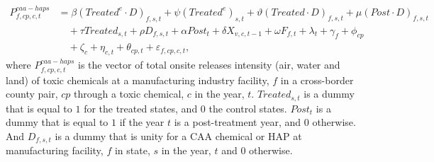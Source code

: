 \documentclass[12pt, english]{article}
\begin{document}
    \begin{align}
        P_{f,cp,c,t}^{caa-haps} &= \beta (Treated^{e} \cdot D)_{f,s,t} + \psi (Treated^{e})_{s,t} + \vartheta (Treated \cdot D)_{f,s,t} + \mu (Post \cdot D)_{f,s,t} \nonumber \\
        &\quad + \tau Treated_{s,t} + \rho D_{f,s,t} + \alpha Post_{t} + \delta X_{v,c,t-1} + \omega F_{f,t} + \lambda_{t} + \gamma_{f} + \phi_{cp} \nonumber \\
        &\quad + \zeta_{c} + \eta_{c,t} + \theta_{cp,t} + \varepsilon_{f,cp,c,t},\label{eq:heterogeneous-onsite-releases-intensity-caahaps}
    \end{align}
    where $P_{f,cp,c,t}^{caa-haps}$ is the vector of total onsite releases intensity (air, water and land) of toxic chemicals at a manufacturing industry facility, $f$ in a cross-border county pair, $cp$ through a toxic chemical, $c$ in the year, $t$. $Treated_{s,t}$ is a dummy that is equal to $1$ for the treated states, and $0$ the control states. $Post_{t}$ is a dummy that is equal to $1$ if the year $t$ is a post-treatment year, and $0$ otherwise. And $D_{f,s,t}$ is a dummy that is unity for a CAA chemical or HAP at manufacturing facility, $f$ in state, $s$ in the year, $t$ and $0$ otherwise.
    
\end{document}
